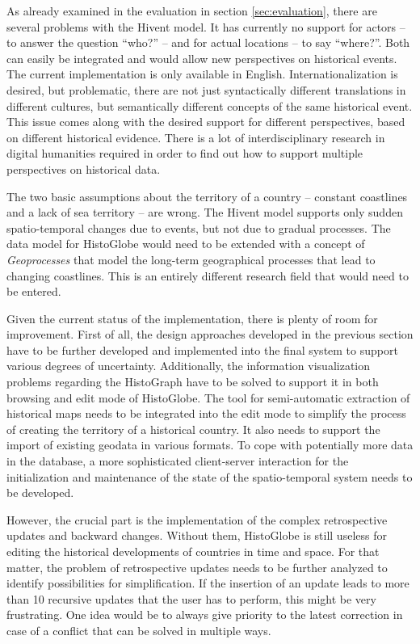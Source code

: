 As already examined in the evaluation in section \ref{sec:evaluation}, there are several problems with the Hivent model. It has currently no support for actors -- to answer the question ``who?'' -- and for actual locations -- to say ``where?''. Both can easily be integrated and would allow new perspectives on historical events. The current implementation is only available in English. Internationalization is desired, but problematic,
there are not just syntactically different translations in different cultures, but semantically different concepts of the same historical event. This issue comes along with the desired support for different perspectives, based on different historical evidence. There is a lot of interdisciplinary research
in digital humanities required in order to find out how to support multiple perspectives on historical data.

The two basic assumptions about the territory of a country -- constant coastlines and a lack of sea territory -- are wrong. The Hivent model supports only sudden spatio-temporal changes due to events, but not due to gradual processes. The data model for HistoGlobe would need to be extended with a concept of \emph{Geoprocesses} that model the long-term geographical processes that lead to changing coastlines. This is an entirely different research field that would need to be entered.

Given the current status of the implementation, there is plenty of room for improvement. First of all, the design approaches developed in the previous section have to be further developed and implemented into the final system to support various degrees of uncertainty. Additionally, the information visualization problems regarding the HistoGraph have to be solved to support it in both browsing and edit mode of HistoGlobe. The tool for semi-automatic extraction of historical maps needs to be integrated into the edit mode to simplify the process of creating the territory of a historical country. It also needs to support the import of existing geodata in various formats. To cope with potentially more data in the database, a more sophisticated client-server interaction for the initialization and maintenance of the state of the spatio-temporal system needs to be developed.

\newpage
However, the crucial part is the implementation of the complex retrospective updates and backward changes. Without them, HistoGlobe is still useless for editing the historical developments of countries in time and space. For that matter, the problem of retrospective updates needs to be further analyzed to identify possibilities for simplification. If the insertion of an update leads to more than 10 recursive updates that the user has to perform, this might be very frustrating. One idea would be to always give priority to the latest correction in case of a conflict that can be solved in multiple ways.

